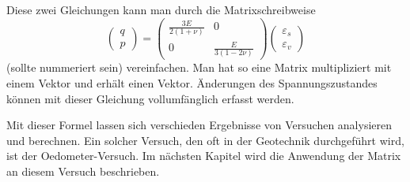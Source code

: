 Diese zwei Gleichungen kann man durch die Matrixschreibweise
\[
\begin{pmatrix}
	q\\
	p
\end{pmatrix}
=
\begin{pmatrix}
	\frac{3E}{2(1+\nu)} &                   0 \\
	                  0 & \frac{E}{3(1-2\nu)}
\end{pmatrix}
\begin{pmatrix}
	\varepsilon_{s}\\
	\varepsilon_{v}
\end{pmatrix}
\]
(sollte nummeriert sein) vereinfachen.
Man hat so eine Matrix multipliziert mit einem Vektor und erhält einen Vektor.
Änderungen des Spannungszustandes können mit dieser Gleichung vollumfänglich erfasst werden.

Mit dieser Formel lassen sich verschieden Ergebnisse von Versuchen analysieren und berechnen.
Ein solcher Versuch, den oft in der Geotechnik durchgeführt wird, ist der Oedometer-Versuch.
Im nächsten Kapitel wird die Anwendung der Matrix an diesem Versuch beschrieben.